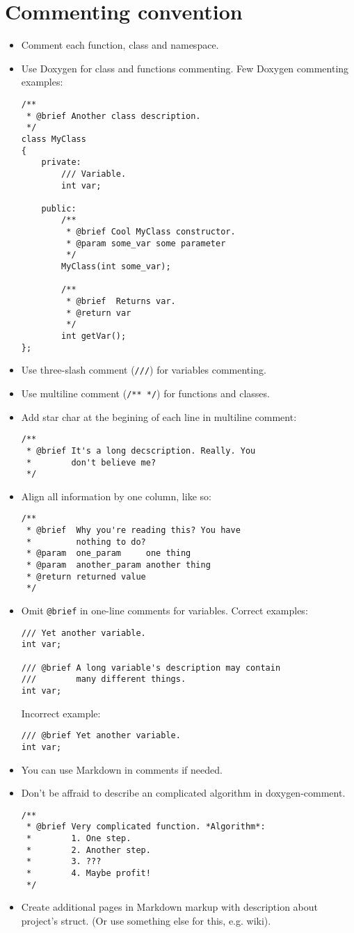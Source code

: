\documentclass[12pt]{article}
\newcommand{\code}[1]{\colorbox{verylightgray}{\lstinline!#1!}}
\begin{document}
	\section{Commenting convention}
		\begin{itemize}
			\item Comment each function, class and namespace.
			\item Use Doxygen for class and functions commenting. Few Doxygen commenting examples:
\begin{lstlisting}
/**
 * @brief Another class description.
 */
class MyClass
{
	private:
		/// Variable.
		int var;

	public:
		/**
		 * @brief Cool MyClass constructor.
		 * @param some_var some parameter
		 */
		MyClass(int some_var);

		/**
		 * @brief  Returns var.
		 * @return var
		 */
		int getVar();
};
\end{lstlisting}
			\item Use three-slash comment (\code{///}) for variables commenting.
			\item Use multiline comment (\code{/** */}) for functions and classes.
			\item Add star char at the begining of each line in multiline comment:
\begin{lstlisting}
/**
 * @brief It's a long decscription. Really. You
 *        don't believe me?
 */
\end{lstlisting}
			\item Align all information by one column, like so:
\begin{lstlisting}
/**
 * @brief  Why you're reading this? You have
 *         nothing to do?
 * @param  one_param     one thing
 * @param  another_param another thing
 * @return returned value
 */
\end{lstlisting}
			\item Omit \code{@brief} in one-line comments for variables. Correct examples:
\begin{lstlisting}
/// Yet another variable.
int var;

/// @brief A long variable's description may contain
///        many different things.
int var;
\end{lstlisting}
				Incorrect example:
\begin{lstlisting}
/// @brief Yet another variable.
int var;
\end{lstlisting}
			\item You can use Markdown in comments if needed.
			\item Don't be affraid to describe an complicated algorithm in doxygen-comment.
\begin{lstlisting}
/**
 * @brief Very complicated function. *Algorithm*:
 *        1. One step.
 *        2. Another step.
 *        3. ???
 *        4. Maybe profit!
 */
\end{lstlisting}
			\item Create additional pages in Markdown markup with description about project's struct. (Or use something else for this, e.g. wiki).
		\end{itemize}
\end{document}
